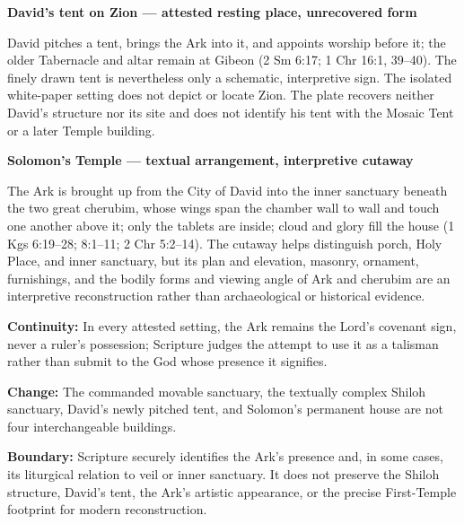 \clearpage
\begin{center}
{\bfseries David's tent on Zion --- attested resting place, unrecovered form\par}
\vspace{0.25em}

\begin{minipage}{0.91\linewidth}
\footnotesize
David pitches a tent, brings the Ark into it, and appoints worship before it;
the older Tabernacle and altar remain at Gibeon (2 Sm 6:17; 1 Chr 16:1,
39--40).  The finely drawn tent is nevertheless only a schematic,
interpretive sign.  The isolated white-paper setting does not depict or locate
Zion.  The plate recovers neither David's structure nor its site and does not
identify his tent with the Mosaic Tent or a later Temple building.
\end{minipage}

\vspace{0.8em}
{\bfseries Solomon's Temple --- textual arrangement, interpretive cutaway\par}
\vspace{0.25em}

\begin{minipage}{0.91\linewidth}
\footnotesize
The Ark is brought up from the City of David into the inner sanctuary beneath
the two great cherubim, whose wings span the chamber wall to wall and touch
one another above it; only the tablets are inside; cloud and glory fill the
house (1 Kgs 6:19--28; 8:1--11; 2 Chr 5:2--14).  The cutaway helps distinguish
porch, Holy Place, and inner sanctuary, but its plan and elevation, masonry,
ornament, furnishings, and the bodily forms and viewing angle of Ark and
cherubim are an interpretive reconstruction rather than archaeological or
historical evidence.
\end{minipage}
\end{center}

\begin{studyframe}
\textbf{Continuity:} In every attested setting, the Ark remains the Lord's
covenant sign, never a ruler's possession; Scripture judges the attempt to use
it as a talisman rather than submit to the God whose presence it signifies.
\par
\textbf{Change:} The commanded movable sanctuary, the textually complex Shiloh
sanctuary, David's newly pitched tent, and Solomon's permanent house are not
four interchangeable buildings.
\par
\textbf{Boundary:} Scripture securely identifies the Ark's presence and, in
some cases, its liturgical relation to veil or inner sanctuary.  It does not
preserve the Shiloh structure, David's tent, the Ark's artistic appearance, or
the precise First-Temple footprint for modern reconstruction.
\end{studyframe}
